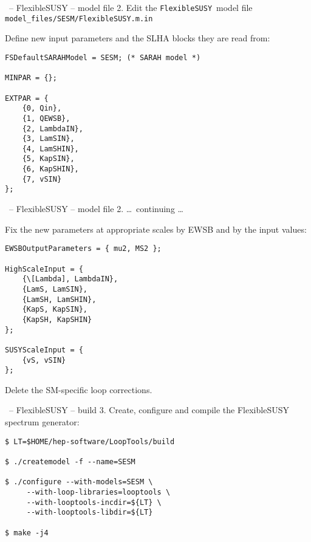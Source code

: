 \documentclass[11pt]{beamer}
\newcommand{\FlexibleSUSY}{\texttt{FlexibleSUSY}}
\begin{document}
\begin{frame}[fragile]{\insertsection\ -- FlexibleSUSY -- model file}
  2. Edit the \FlexibleSUSY\ model file
  \texttt{model\_files/SESM/FlexibleSUSY.m.in}

  \bigskip

  Define new input parameters and the SLHA blocks they are read from:
  \begin{lstlisting}
FSDefaultSARAHModel = SESM; (* SARAH model *)

MINPAR = {};

EXTPAR = {
    {0, Qin},
    {1, QEWSB},
    {2, LambdaIN},
    {3, LamSIN},
    {4, LamSHIN},
    {5, KapSIN},
    {6, KapSHIN},
    {7, vSIN}
};\end{lstlisting}%
\end{frame}


\begin{frame}[fragile]{\insertsection\ -- FlexibleSUSY -- model file}
  2. \ldots\ continuing \ldots

  \bigskip

  Fix the new parameters at appropriate scales by EWSB and by the
  input values:
  \begin{lstlisting}
EWSBOutputParameters = { mu2, MS2 };

HighScaleInput = {
    {\[Lambda], LambdaIN},
    {LamS, LamSIN},
    {LamSH, LamSHIN},
    {KapS, KapSIN},
    {KapSH, KapSHIN}
};

SUSYScaleInput = {
    {vS, vSIN}
};\end{lstlisting}%
  Delete the SM-specific loop corrections.
\end{frame}


\begin{frame}[fragile]{\insertsection\ -- FlexibleSUSY -- build}
  3. Create, configure and compile the FlexibleSUSY spectrum
  generator:
  \begin{lstlisting}
$ LT=$HOME/hep-software/LoopTools/build

$ ./createmodel -f --name=SESM

$ ./configure --with-models=SESM \
     --with-loop-libraries=looptools \
     --with-looptools-incdir=${LT} \
     --with-looptools-libdir=${LT}

$ make -j4\end{lstlisting}%
\end{frame}
\end{document}
